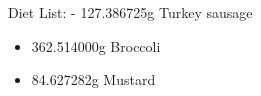 \documentclass[letterpaper]{article}
\begin{document}
Diet List: - 127.386725g Turkey sausage

\begin{itemize}
\item 362.514000g Broccoli

\item 84.627282g Mustard
\end{itemize}
\end{document}
